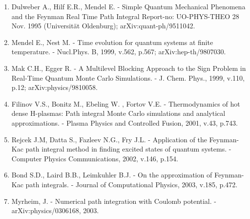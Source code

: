 \documentclass[11pt]{article}
\begin{document}
{\begin{enumerate}
\item Dulweber A., Hilf E.R., Mendel E. -
	Simple Quantum Mechanical Phenomena and the Feynman Real Time Path Integral
	Report-no: UO-PHYS-THEO 28 Nov. 1995 (Universit\"at Oldenburg); arXiv:quant-ph/9511042.
\item Mendel E., Nest M. - Time evolution for quantum systems at finite    temperature. -
	Nucl.Phys. B, 1999, v.562, p.567; %
	arXiv:hep-th/9807030.
\item  Mak C.H.,  Egger R. -
	A Multilevel Blocking Approach to the Sign Problem in Real-Time Quantum
	Monte Carlo Simulations. - J. Chem. Phys., 1999, v.110, p.12;
	arXiv:physics/9810058.
\item Filinov V.S., Bonitz M., Ebeling W. , Fortov V.E. - Thermodynamics
	of hot dense H-plasmas: Path integral Monte Carlo simulations and analytical
	approximations. - Plasma Physics and Controlled Fusion, 2001, v.43, p.743.
\item Rejcek J.M, Datta S., Fazleev N.G., Fry J.L. - Application of the Feynman-Kac
	path integral method in finding excited states of quantum systems. -
	Computer Physics Communications, 2002, v.146, p.154. %
\item Bond S.D.,  Laird B.B., Leimkuhler B.J. -
	On the approximation of Feynman-Kac path integrals. -
	Journal of Computational Physics, 2003, v.185, p.472. %
\item Myrheim, J. - Numerical path integration with Coulomb potential. -
	arXiv:physics/0306168, 2003.
\end{enumerate}

}
\end{document}

